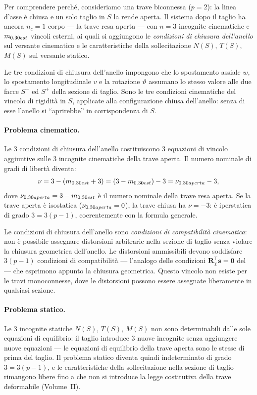 Per comprendere perché, consideriamo una trave
biconnessa ($p = 2$): la linea d'asse è chiusa
e un solo taglio in $S$ la rende aperta. Il sistema
dopo il taglio ha ancora $n_c = 1$ corpo --- la
trave resa aperta --- con $n = 3$ incognite
cinematiche e $m_{\rm est}$ vincoli esterni, ai
quali si aggiungono le \emph{condizioni di chiusura
	dell'anello} sul versante cinematico e le
caratteristiche della sollecitazione $N(S)$, $T(S)$,
$M(S)$ sul versante statico.

Le tre condizioni di chiusura dell'anello impongono
che lo spostamento assiale $w$, lo spostamento
longitudinale $v$ e la rotazione $\vartheta$ assumano
lo stesso valore alle due facce $S^-$ ed $S^+$
della sezione di taglio. Sono le tre condizioni
cinematiche del vincolo di rigidità in $S$,
applicate alla configurazione chiusa dell'anello:
senza di esse l'anello si ``aprirebbe'' in
corrispondenza di $S$.

\paragraph{Problema cinematico.}
Le $3$ condizioni di chiusura dell'anello
costituiscono $3$ equazioni di vincolo aggiuntive
sulle $3$ incognite cinematiche della trave aperta.
Il numero nominale di gradi di libertà diventa:
\begin{equation}
	\nu = 3 - (m_{\rm est} + 3)
	= (3 - m_{\rm est}) - 3
	= \nu_{\rm aperta} - 3,
\end{equation}
dove $\nu_{\rm aperta} = 3 - m_{\rm est}$ è il
numero nominale della trave resa aperta. Se la
trave aperta è isostatica ($\nu_{\rm aperta} = 0$),
la trave chiusa ha $\nu = -3$: è iperstatica di
grado $3 = 3(p-1)$, coerentemente con la formula
generale.

Le condizioni di chiusura dell'anello sono
\emph{condizioni di compatibilità cinematica}:
non è possibile assegnare distorsioni arbitrarie
nella sezione di taglio senza violare la chiusura
geometrica dell'anello. Le distorsioni ammissibili
devono soddisfare $3(p-1)$ condizioni di
compatibilità --- l'analogo delle condizioni
$\bm{R}_\chi^\top \bm{s} = \bm{0}$ del
 --- che
esprimono appunto la chiusura geometrica.
Questo vincolo non esiste per le travi monoconnesse,
dove le distorsioni possono essere assegnate
liberamente in qualsiasi sezione.


\paragraph{Problema statico.}
Le $3$ incognite statiche $N(S)$, $T(S)$, $M(S)$
non sono determinabili dalle sole equazioni di
equilibrio: il taglio introduce $3$ nuove incognite
senza aggiungere nuove equazioni --- le equazioni
di equilibrio della trave aperta sono le stesse di
prima del taglio. Il problema statico diventa quindi
indeterminato di grado $3 = 3(p-1)$, e le
caratteristiche della sollecitazione nella sezione
di taglio rimangono libere fino a che non si
introduce la legge costitutiva della trave
deformabile (Volume~II).



